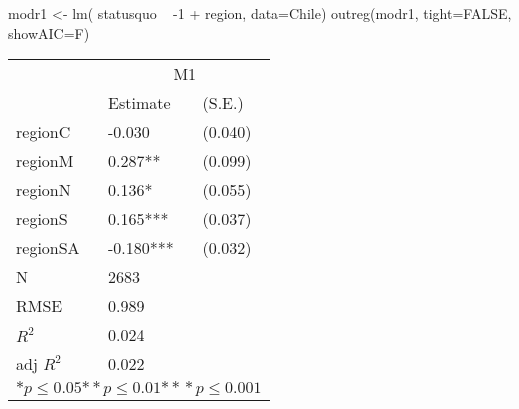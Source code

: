 \begin{Schunk}
\begin{Sinput}
 modr1 <- lm( statusquo ~ -1 + region, data=Chile)
 outreg(modr1, tight=FALSE, showAIC=F)
\end{Sinput}
\begin{tabular}{*{3}{l}}
\hline
                  & \multicolumn{2}{c}{M1}   \tabularnewline
                   &Estimate  &(S.E.)  \tabularnewline
 \hline
 \hline
   regionC         &-0.030   &   (0.040) \tabularnewline
   regionM         &0.287**   &   (0.099) \tabularnewline
   regionN         &0.136*   &   (0.055) \tabularnewline
   regionS         &0.165***   &   (0.037) \tabularnewline
   regionSA        &-0.180***   &   (0.032) \tabularnewline
 \hline
 N                 &2683       &        \tabularnewline
 RMSE             &0.989         & \tabularnewline
 $R^2$             &0.024         & \tabularnewline
 adj $R^2$         &0.022         & \tabularnewline
 \hline
\hline
 
 \multicolumn{3}{c}{${*  p}\le 0.05$${*\!\!*  p}\le 0.01$${*\!\!*\!\!*  p}\le 0.001$}\tabularnewline
 \end{tabular}\end{Schunk}

